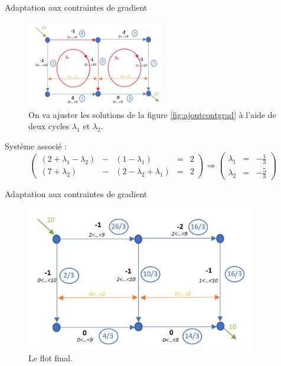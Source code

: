 \documentclass{beamer}
\begin{document}
\begin{frame}{Adaptation aux contraintes de gradient}
    \begin{figure}[H]
        \centering
        \includegraphics[width=6cm]{cyclessanssol.JPG}
        \caption{On va ajuster les solutions de la figure \ref{fig:ajoutcontgrad} à l'aide de deux cycles $\lambda_1$ et $\lambda_2$. }
        \label{fig:cycles}


    \end{figure}
    Système associé : 
    $$
    \left(
    \begin{matrix}
    (2+\lambda_1 - \lambda_2 ) & - & (1-\lambda_1) & = & 2\\
    (7+\lambda_2) & - & (2-\lambda_2 + \lambda_1) & = & 2
    \end{matrix}\right)
    \Rightarrow
    \left(
    \begin{matrix}
    \lambda_1 &=& -\frac{1}{3}\\
    \lambda_2 & = & -\frac{5}{3}
    \end{matrix}\right)
    $$
\insertframenumber\end{frame}
\begin{frame}{Adaptation aux contraintes de gradient}
    \begin{figure}[H]
        \centering
        \includegraphics[width=10cm]{solfinale.JPG}
        \caption{Le flot final.}
        \label{fig:solfinale}
    \end{figure}
\insertframenumber\end{frame}
\end{document}
